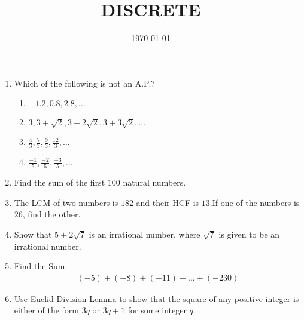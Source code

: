 \documentclass{article}
\title{DISCRETE}
\date{ \today}
\providecommand{\brak}[1]{\ensuremath{\left(#1\right)}}
\begin{document}
\maketitle
\begin{enumerate}
\item Which of the following is not an A.P.? 
\begin{enumerate}[label =(\Alph*)]
               \item $-1.2,0.8,2.8,\dots$ 
		\item $3,3+\sqrt2,3+2\sqrt2,3+3\sqrt2,\dots$ 
		\item $\frac{4}{3},\frac{7}{3},\frac{9}{3},\frac{12}{3},\dots$ 
		\item $\frac{-1}{5},\frac{-2}{5},\frac{-3}{5},\dots$ 
\end{enumerate}

\item Find the sum of the first $100$ natural numbers.	

\item The LCM of two numbers is $182$ and their HCF is $13$.If one of the numbers is $26$, find the other.

\item Show that $5+2\sqrt7$ is an irrational number, where $\sqrt7$ is given to be an irrational number.

\item Find the Sum:
\begin{align*}
	\brak{-5} + \brak{-8} + \brak{-11} + \dots + \brak{-230}
\end{align*}

\item Use Euclid Division Lemma to show that the square of any positive integer is either of the form $3q$ or $3q+1$ for some integer $q$.
\end{enumerate}
\end{document}
